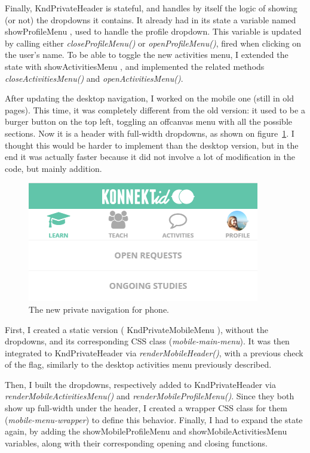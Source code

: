 Finally, KndPrivateHeader is stateful, and handles by itself the logic of showing (or not) the dropdowns it contains. It already had in its state a variable named \guillemotleft{} showProfileMenu \guillemotright{}, used to handle the profile dropdown. This variable is updated by calling either \textit{closeProfileMenu()} or \textit{openProfileMenu()}, fired when clicking on the user's name. To be able to toggle the new activities menu, I extended the state with \guillemotleft{} showActivitiesMenu \guillemotright{}, and implemented the related methods \textit{closeActivitiesMenu()} and \textit{openActivitiesMenu()}.

After updating the desktop navigation, I worked on the mobile one (still in old pages). This time, it was completely different from the old version: it used to be a burger button on the top left, toggling an offcanvas menu with all the possible sections. Now it is a header with full-width dropdowns, as shown on {\sc figure}~\ref{fig:newNavPhone}. I thought this would be harder to implement than the desktop version, but in the end it was actually faster because it did not involve a lot of modification in the code, but mainly addition.

\begin{figure}[H]
    \centering
    \includegraphics{figure/newNavPhone.png}
    \caption{The new private navigation for phone.}
    \label{fig:newNavPhone}
\end{figure}

First, I created a static version (\guillemotleft{} KndPrivateMobileMenu \guillemotright{}), without the dropdowns, and its corresponding CSS class (\textit{mobile-main-menu}). It was then integrated to KndPrivateHeader via \textit{renderMobileHeader()}, with a previous check of the flag, similarly to the desktop activities menu previously described.

Then, I built the dropdowns, respectively added to KndPrivateHeader via \textit{renderMobileActivitiesMenu()} and \textit{renderMobileProfileMenu()}. Since they both show up full-width under the header, I created a wrapper CSS class for them (\textit{mobile-menu-wrapper}) to define this behavior. Finally, I had to expand the state again, by adding the \guillemotleft{} showMobileProfileMenu \guillemotright{} and \guillemotleft{} showMobileActivitiesMenu \guillemotright{} variables, along with their corresponding opening and closing functions.

